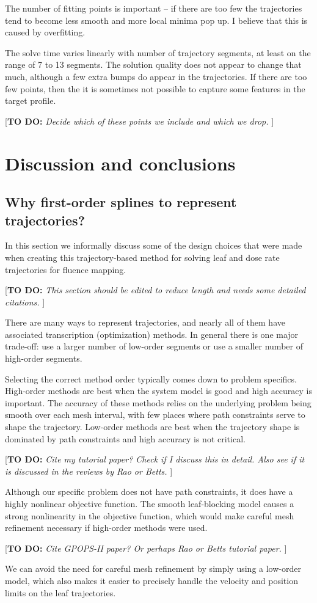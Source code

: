 \documentclass[12pt]{article}
\newcommand{\todo}[1]{{\color{lightblue}\par {[{\bf TO DO: } {\em #1}} ] \\    }}
\begin{document}
The number of fitting points is important -- if there are too few the trajectories tend to
become less smooth and more local minima pop up. I believe that this is caused by overfitting.

The solve time varies linearly with number of trajectory segments, at least on the range of 7 to 13 segments.
The solution quality does not appear to change that much, although a few extra bumps do appear in the trajectories.
If there are too few points, then the it is sometimes not possible to capture some features in the target profile.

\todo{Decide which of these points we include and which we drop.}

\section{Discussion and conclusions}


\subsection{Why first-order splines to represent trajectories?}
\label{sec:WhyUseLinearSplines}

In this section we informally discuss some of the design choices that were made when creating this
trajectory-based method for solving leaf and dose rate trajectories for fluence mapping.

\todo{This section should be edited to reduce length and needs some detailed citations.}

There are many ways to represent trajectories, and nearly all of them have associated transcription (optimization) methods.
In general there is one major trade-off:
use a larger number of low-order segments or
use a smaller number of high-order segments.

Selecting the correct method order typically comes down to problem specifics.
High-order methods are best when the system model is good and high accuracy is important.
The accuracy of these methods relies on the underlying problem being smooth over each
mesh interval, with few places where path constraints serve to shape the trajectory.
Low-order methods are best when the trajectory shape is dominated by path constraints and
high accuracy is not critical.
\todo{Cite my tutorial paper? Check if I discuss this in detail.
Also see if it is discussed in the reviews by Rao or Betts.}

Although our specific problem does not have path constraints, it does have a highly nonlinear objective function.
The smooth leaf-blocking model causes a strong nonlinearity in the objective function,
which would make careful mesh refinement necessary if high-order methods were used.
\todo{Cite GPOPS-II paper? Or perhaps Rao or Betts tutorial paper.}
We can avoid the need for careful mesh refinement by simply using a low-order model,
which also makes it easier to precisely handle the velocity and position limits on the leaf trajectories.
\end{document}
